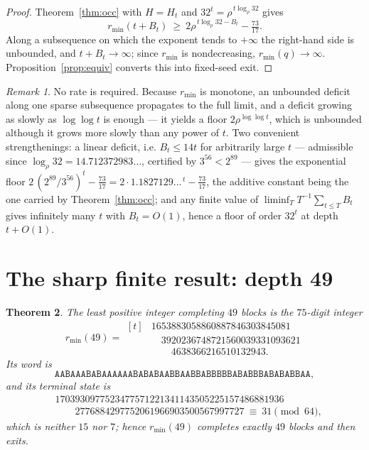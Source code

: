 \documentclass[11pt,a4paper]{article}
\theoremstyle{plain}
\newtheorem{theorem}{Theorem}[section]
\theoremstyle{definition}
\theoremstyle{remark}
\newtheorem{remark}[theorem]{Remark}
\begin{document}
\begin{proof}
Theorem~\ref{thm:occ} with $H=H_t$ and $32^t=\rho^{\,t\log_\rho 32}$ gives
\[
r_{\min}(t+B_t)\ \ge\ 2\rho^{\,t\log_\rho 32-B_t}-\tfrac{73}{17}.
\]
Along a subsequence on which the exponent tends to $+\infty$ the right-hand
side is unbounded, and $t+B_t\to\infty$; since $r_{\min}$ is nondecreasing,
$r_{\min}(q)\to\infty$. Proposition~\ref{prop:equiv} converts this into
fixed-seed exit.
\end{proof}

\begin{remark}
No rate is required. Because $r_{\min}$ is monotone, an unbounded deficit along
one sparse subsequence propagates to the full limit, and a deficit growing as
slowly as $\log\log t$ is enough --- it yields a floor
$2\rho^{\log\log t}$, which is unbounded although it grows more slowly than any
power of $t$. Two convenient strengthenings: a linear deficit, i.e.
$B_t\le 14t$ for arbitrarily large $t$ --- admissible since
$\log_\rho 32=14.712372983\ldots$, certified by $3^{56}<2^{89}$ --- gives the
exponential floor $2\,(2^{89}/3^{56})^{t}-\tfrac{73}{17}
=2\cdot 1.1827129\ldots^{\,t}-\tfrac{73}{17}$, the additive constant being the
one carried by Theorem~\ref{thm:occ}; and any
finite value of $\liminf_T T^{-1}\sum_{t\le T}B_t$ gives infinitely many $t$
with $B_t=O(1)$, hence a floor of order $32^t$ at depth $t+O(1)$.
\end{remark}

\section{The sharp finite result: depth 49}

\begin{theorem}\label{thm:min49}
The least positive integer completing $49$ blocks is the $75$-digit integer
\[
r_{\min}(49)=
\begin{aligned}[t]
&1653883058860887846303845081\\
&\quad 3920236748721560039331093621\\
&\quad\quad 4638366216510132943 .
\end{aligned}
\]
Its word is
\[
\texttt{AABAAABABAAAAAABABABAABBAABBABBBBBABABBBABABABBAA},
\]
and its terminal state is
\begin{align*}
&1703930977523477571221341143505225157486881936\\
&\qquad 2776884297752061966903500567997727\ \equiv\ 31 \pmod{64},
\end{align*}
which is neither $15$ nor $7$; hence $r_{\min}(49)$ completes exactly $49$
blocks and then exits.
\end{theorem}
\end{document}
